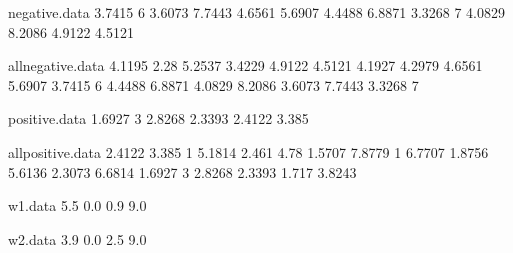 \begin{filecontents}{negative.data}
3.7415	6
3.6073	7.7443
4.6561	5.6907
4.4488	6.8871
3.3268	7
4.0829	8.2086
4.9122	4.5121
\end{filecontents}

\begin{filecontents}{allnegative.data}
4.1195	2.28
5.2537	3.4229
4.9122	4.5121
4.1927	4.2979
4.6561	5.6907
3.7415	6
4.4488	6.8871
4.0829	8.2086
3.6073	7.7443
3.3268	7
\end{filecontents}

\begin{filecontents}{positive.data}
1.6927	3
2.8268	2.3393
2.4122	3.385
\end{filecontents}

\begin{filecontents}{allpositive.data}
2.4122	3.385
1	5.1814
2.461	4.78
1.5707	7.8779
1	6.7707
1.8756	5.6136
2.3073	6.6814
1.6927	3
2.8268	2.3393
1.717	3.8243
\end{filecontents}

\begin{filecontents}{w1.data}
5.5    0.0
0.9    9.0
\end{filecontents}

\begin{filecontents}{w2.data}
3.9   0.0
2.5   9.0
\end{filecontents}

\documentclass{beamer}

{
  \usetheme{Madrid}


}

\usepackage[english]{babel}

\usepackage[latin1]{inputenc}


\usepackage{times}
\usepackage{colortbl}
\usepackage[T1]{fontenc}

\usepackage{graphicx,fancybox}
\usepackage{tabularx}
\usepackage{algorithmic}
\usepackage{tikz}
\usetikzlibrary{shapes,snakes,matrix,arrows,decorations,shadows,plotmarks,calc}



